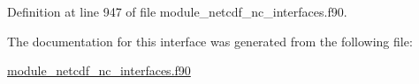 Definition at line 947 of file module\+\_\+netcdf\+\_\+nc\+\_\+interfaces.\+f90.



The documentation for this interface was generated from the following file\+:\begin{DoxyCompactItemize}
\item 
\hyperlink{module__netcdf__nc__interfaces_8f90}{module\+\_\+netcdf\+\_\+nc\+\_\+interfaces.\+f90}\end{DoxyCompactItemize}
